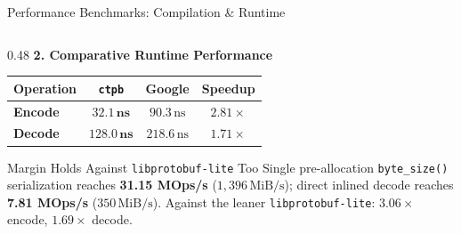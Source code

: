\documentclass[aspectratio=169,10pt]{beamer}
\begin{document}
\begin{frame}{Performance Benchmarks: Compilation \& Runtime}
\begin{columns}[T]
    \begin{column}{0.48\textwidth}
      \textbf{2. Comparative Runtime Performance}
      \begin{table}
        \scriptsize
        \setlength{\tabcolsep}{3pt}
        \begin{tabular}{lccc}
          \toprule
          \textbf{Operation} & \textbf{\texttt{ctpb}} & \textbf{Google} & \textbf{Speedup} \\
          \midrule
          \textbf{Encode} & $\mathbf{32.1\,\text{ns}}$ & $90.3\,\text{ns}$ & $\mathbf{2.81\times}$ \\
          \textbf{Decode} & $\mathbf{128.0\,\text{ns}}$ & $218.6\,\text{ns}$ & $\mathbf{1.71\times}$ \\
          \bottomrule
        \end{tabular}
      \end{table}
      \vspace{0.3em}
      \begin{exampleblock}{Margin Holds Against \texttt{libprotobuf-lite} Too}
        Single pre-allocation \texttt{byte\_size()} serialization reaches \textbf{31.15 MOps/s} ($1{,}396\,\text{MiB/s}$); direct inlined decode reaches \textbf{7.81 MOps/s} ($350\,\text{MiB/s}$). Against the leaner \texttt{libprotobuf-lite}: $\mathbf{3.06\times}$ encode, $\mathbf{1.69\times}$ decode.
      \end{exampleblock}
    \end{column}
  \end{columns}
\end{frame}
\end{document}
